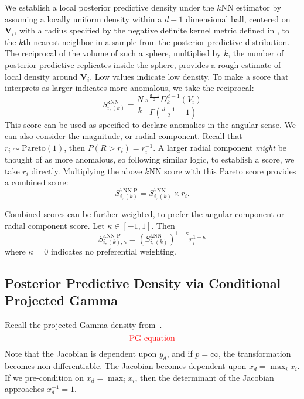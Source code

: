 We establish a local posterior predictive density under the $k$NN estimator by 
  assuming a locally uniform density within a $d-1$ dimensional ball, centered 
  on $\bm{V}_i$, with a radius specified by the negative definite kernel metric 
  defined in \cite{trubey:pg}, to the $k$th nearest neighbor in a sample from 
  the posterior predictive distribution.  The reciprocal of the volume of such 
  a sphere, multiplied by $k$, the number of posterior predictive replicates 
  inside the sphere, provides a rough estimate of local density around 
  $\bm{V}_i$. Low values indicate low density. To make a score that interprets 
  as larger indicates more anomalous, we take the reciprocal:
  \begin{equation}
    \label{eqn:ad_knn}
    S_{i,(k)}^{\text{kNN}} = \frac{N}{k}
      \frac{\pi^{\frac{d-1}{2}}D_{k}^{d-1}(V_i)}{\Gamma\left(\frac{d-1}{2} - 1\right)}
  \end{equation}
  This score can be used as specified to declare anomalies in the angular sense.
  We can also consider the magnitude, or radial component.  Recall that 
  $r_i \sim \text{Pareto}(1)$, then $P(R > r_i) = r_i^{-1}$.  A larger radial 
  component \emph{might} be thought of as more anomalous, so following similar
  logic, to establish a score, we take $r_i$ directly.  Multiplying the above 
  $k$NN score with this Pareto score provides a combined score:
  \begin{equation}
    \label{eqn:ad_knn_p}
    S_{i,(k)}^{\text{kNN-P}} = S_{i,(k)}^{\text{kNN}}\times r_i.
  \end{equation}

Combined scores can be further weighted, to prefer the angular component or 
  radial component score. Let $\kappa \in [-1,1]$.  Then
  \begin{equation}
    S_{i,(k),\kappa}^{\text{kNN-P}} = 
        \left(S_{i,(k)}^{\text{kNN}}\right)^{1 + \kappa}r_i^{1-\kappa}
  \end{equation}
  where $\kappa = 0$ indicates no preferential weighting.

\subsection{Posterior Predictive Density via Conditional Projected Gamma}

Recall the projected Gamma density from~\cite{trubey:pg}.
  \[
    \text{\textcolor{red}{PG equation}}
  \]
Note that the Jacobian is dependent upon $y_d$, and if $p = \infty$, the 
  transformation becomes non-differentiable.  The Jacobian becomes dependent 
  upon $x_d = \max_ix_i$.  If we pre-condition on $x_d = \max_ix_i$, then the 
  determinant of the Jacobian approaches $x_d^{-1} = 1$.


